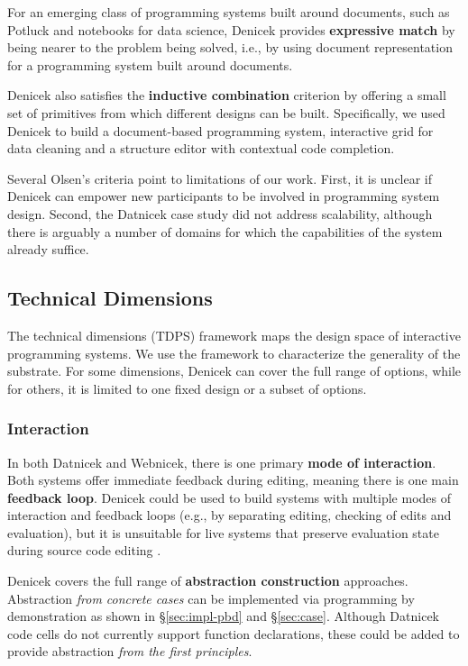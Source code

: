 \documentclass[sigconf,anonymous,screen]{acmart}
\begin{document}
For an emerging class of programming systems built around documents, such as Potluck \cite{litt-2020-potluck}
and notebooks for data science, Denicek provides \textbf{expressive match} by being nearer to the
problem being solved, i.e., by using document representation for a programming system built around
documents.

Denicek also satisfies the \textbf{inductive combination}
criterion by offering a small set of primitives from which different designs can be built.
Specifically, we used Denicek to build a document-based programming system, interactive
grid for data cleaning and a structure editor with contextual code completion.

Several Olsen's criteria point to limitations of our work. First, it is unclear if Denicek
can empower new participants to be involved in programming system design. Second, the Datnicek
case study did not address scalability, although there is arguably a number of domains for which
the capabilities of the system already suffice.

\subsection{Technical Dimensions}
The technical dimensions (TDPS) framework \cite{jakubovic-2023-techdims} maps the design space of
interactive programming systems. We use the framework to characterize the generality of the
substrate.  For some dimensions, Denicek can cover the full range of options, while for others,
it is limited to one fixed design or a subset of options.

\subsubsection*{Interaction}
In both Datnicek and Webnicek, there is one primary \textbf{mode of interaction}. Both
systems offer immediate feedback during editing, meaning there is one main \textbf{feedback loop}.
Denicek could be used to build systems with multiple modes of interaction and feedback loops
(e.g., by separating editing, checking of edits and evaluation), but it is unsuitable for live
systems that preserve evaluation state during source code editing \cite{burckhardt-2013-live}.

Denicek covers the full range of \textbf{abstraction construction} approaches.
Abstraction \emph{from concrete cases} can be implemented via programming by demonstration as
shown in \S\ref{sec:impl-pbd} and \S\ref{sec:case}. Although Datnicek code cells do not currently
support function declarations, these could be added to provide abstraction \emph{from the
first principles}.
\end{document}
